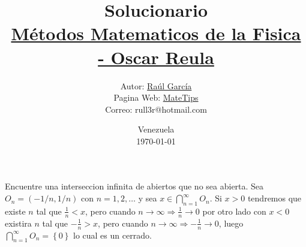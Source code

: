 \documentclass[10pt,a4paper]{jhwhw}
\author{Autor: \href{https://www.facebook.com/ruller}{Raúl García}\\Pagina Web: \href{https://rull3r.github.io/}{MateTips}\\Correo: rull3r@hotmail.com}
\date{Venezuela\\ \today \\}
\title{Solucionario \\\href{https://books.google.co.ve/books?id=i4aToAEACAAJ}{Métodos Matematicos de la Fisica - Oscar Reula}\\}
\begin{document}
	
	\problema{ }\label{pro:1}
	Encuentre una interseccion infinita de abiertos que no sea abierta.
	\solution 
	Sea $O_n=\left( -1/n , 1/n\right) $ con $n=1,2,\ldots$ y sea $x \in \bigcap_{n=1}^{\infty}{O_n}$. Si $x>0$ tendremos que existe $n$ tal que $\frac{1}{n}<x$, pero cuando $n\rightarrow \infty\Rightarrow\frac{1}{n}\rightarrow0$ por otro lado con $x<0$ existira $n$ tal que $-\frac{1}{n}>x$, pero cuando $n\rightarrow \infty\Rightarrow-\frac{1}{n}\rightarrow0$, luego $\bigcap_{n=1}^{\infty}{O_n}=\left\lbrace 0\right\rbrace $ lo cual es un cerrado. \QEPD
	
\end{document}
